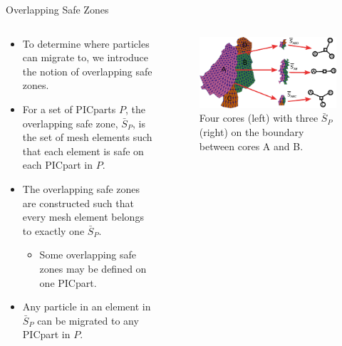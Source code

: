 \documentclass[aspectratio=169]{beamer}
\begin{document}
\begin{frame}{Overlapping Safe Zones}
  \begin{columns}
    \begin{column}{.5\textwidth}
      \begin{itemize}
      \item To determine where particles can migrate to, we introduce the notion of overlapping safe zones.
      \item For a set of PICparts $P$, the overlapping safe zone, $\bar{S}_P$, is the set of mesh elements such that each element is safe on each PICpart in $P$.
      \item The overlapping safe zones are constructed such that every mesh element belongs to exactly one $\bar{S}_P$.
        \begin{itemize}
        \item Some overlapping safe zones may be defined on one PICpart.
        \end{itemize}
      \item Any particle in an element in $\bar{S}_P$ can be migrated to any PICpart in $P$.
      \end{itemize}
    \end{column}
    \begin{column}{.5\textwidth}
      \begin{figure}
        \includegraphics[width=.95\textwidth]{picpart_lb_new.eps}
        \caption*{Four cores (left) with three $\bar{S}_P$(right) on the boundary between cores A and B.}
      \end{figure}
    \end{column}
  \end{columns}
\end{frame}
\end{document}
